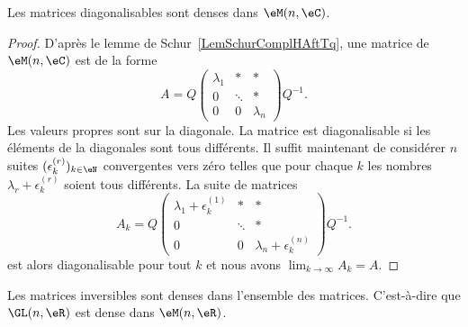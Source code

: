 \begin{proposition}     \label{PropDigDensVxzPuo}
	Les matrices diagonalisables sont denses dans \( \eM(n,\eC)\).
\end{proposition}

\begin{proof}
	D'après le lemme de Schur~\ref{LemSchurComplHAftTq}, une matrice de \( \eM(n,\eC)\) est de la forme
	\begin{equation}
		A=Q\begin{pmatrix}
			\lambda_1 & *      & *         \\
			0         & \ddots & *         \\
			0         & 0      & \lambda_n
		\end{pmatrix}Q^{-1}.
	\end{equation}
	Les valeurs propres sont sur la diagonale. La matrice est diagonalisable si les éléments de la diagonales sont tous différents. Il suffit maintenant de considérer \( n\) suites \( (\epsilon^{(r)}_k)_{k\in\eN}\) convergentes vers zéro telles que pour chaque \( k\) les nombres \( \lambda_r+\epsilon^{(r)}_k\) soient tous différents. La suite de matrices
	\begin{equation}
		A_k=Q\begin{pmatrix}
			\lambda_1+\epsilon^{(1)}_k & *      & *                          \\
			0                          & \ddots & *                          \\
			0                          & 0      & \lambda_n+\epsilon^{(n)}_k
		\end{pmatrix}Q^{-1}.
	\end{equation}
	est alors diagonalisable pour tout \( k\) et nous avons \( \lim_{k\to \infty} A_k=A\).
\end{proof}

\begin{proposition} \label{PropQGUPooVudelJ}
	Les matrices inversibles sont denses dans l'ensemble des matrices. C'est-à-dire que \( \GL(n,\eR)\) est dense dans \( \eM(n,\eR)\).
\end{proposition}

